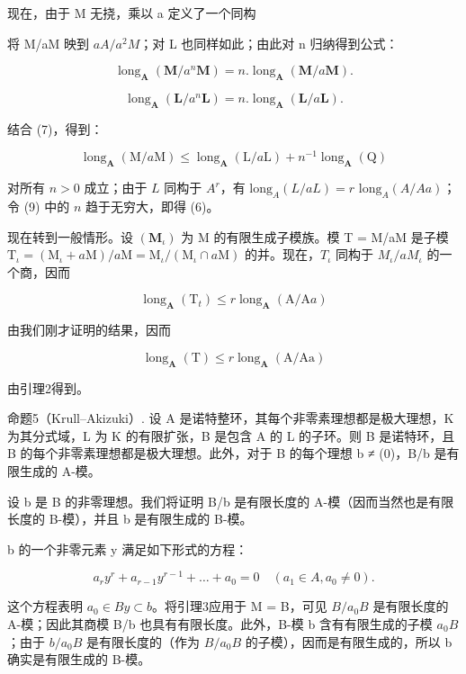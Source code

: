 现在，由于 M 无挠，乘以 a 定义了一个同构

将 M/aM 映到 \(aA/a^{2}M\)；对 L 也同样如此；由此对 n 归纳得到公式：

\[
\operatorname{long} _ {\mathbf {A}} (\mathbf {M} / a ^ {n} \mathbf {M}) = n. \operatorname{long} _ {\mathbf {A}} (\mathbf {M} / a \mathbf {M}).\tag{8}
\]

\[
\operatorname{long} _ {\mathbf {A}} (\mathbf {L} / a ^ {n} \mathbf {L}) = n. \operatorname{long} _ {\mathbf {A}} (\mathbf {L} / a \mathbf {L}).
\]

结合 (7)，得到：

\[
\operatorname{long} _ {\mathbf {A}} (\mathrm{M} / a \mathrm{M}) \leqslant \operatorname{long} _ {\mathbf {A}} (\mathrm{L} / a \mathrm{L}) + n ^ {- 1} \operatorname{long} _ {\mathbf {A}} (\mathrm{Q})\tag{9}
\]

对所有 \(n > 0\) 成立；由于 \(L\) 同构于 \(A^r\)，有 \(\text{long}_A(L/aL) = r \text{ long}_A(A/Aa)\)；令 (9) 中的 \(n\) 趋于无穷大，即得 (6)。

现在转到一般情形。设 \((\mathbf{M}_{\iota})\) 为 M 的有限生成子模族。模 T = M/aM 是子模 \(\mathrm{T}_{\iota} = (\mathrm{M}_{\iota} + a\mathrm{M})/a\mathrm{M} = \mathrm{M}_{\iota}/(\mathrm{M}_{\iota} \cap a\mathrm{M})\) 的并。现在，\(T_{\iota}\) 同构于 \(M_{\iota}/aM_{\iota}\) 的一个商，因而

\[
\operatorname{long} _ {\mathbf {A}} \left(\mathrm{T} _ {t}\right) \leqslant r \operatorname{long} _ {\mathbf {A}} (\mathrm{A} / \mathrm{A} a)
\]

由我们刚才证明的结果，因而

\[
\operatorname{long} _ {\mathbf {A}} (\mathrm{T}) \leqslant r \operatorname{long} _ {\mathbf {A}} (\mathrm{A/Aa})
\]

由引理2得到。

命题5（Krull–Akizuki）. 设 A 是诺特整环，其每个非零素理想都是极大理想，K 为其分式域，L 为 K 的有限扩张，B 是包含 A 的 L 的子环。则 B 是诺特环，且 B 的每个非零素理想都是极大理想。此外，对于 B 的每个理想 b ≠ (0)，B/b 是有限生成的 A-模。

设 b 是 B 的非零理想。我们将证明 B/b 是有限长度的 A-模（因而当然也是有限长度的 B-模），并且 b 是有限生成的 B-模。

b 的一个非零元素 y 满足如下形式的方程：

\[
a _ {r} y ^ {r} + a _ {r - 1} y ^ {r - 1} + \dots + a _ {0} = 0 \quad (a _ {1} \in A, a _ {0} \neq 0).
\]

这个方程表明 \(a_{0} \in By \subset b\)。将引理3应用于 M = B，可见 \(B/a_{0}B\) 是有限长度的 A-模；因此其商模 B/b 也具有有限长度。此外，B-模 b 含有有限生成的子模 \(a_{0}B\)；由于 \(b/a_{0}B\) 是有限长度的（作为 \(B/a_{0}B\) 的子模），因而是有限生成的，所以 b 确实是有限生成的 B-模。

